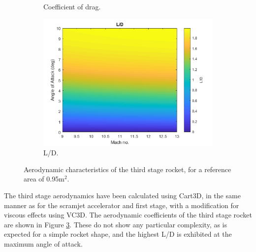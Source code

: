 \begin{figure}[!ht]
\begin{subfigure}{.5\textwidth}
					\caption{Coefficient of drag.}
					\label{fig:Cd-ThirdStage}
				\end{subfigure}
				\begin{subfigure}{.5\textwidth}
					\centering
					\includegraphics[width=0.99\linewidth]{figures/3_vehicle_design/ThirdStageLD}
					\caption{L/D.}
					\label{fig:LD-ThirdStage}
				\end{subfigure}
				\caption{Aerodynamic characteristics of the third stage rocket, for a reference area of 0.95m$^2$.} %
				\label{fig:ThirdStageAero}
			\end{figure}
			\noindent
			The third stage aerodynamics have been calculated using Cart3D, in the same manner as for the  scramjet accelerator and first stage, with a modification for viscous effects using VC3D.
		The aerodynamic coefficients of the third stage rocket are shown in Figure \ref{fig:ThirdStageAero}. These do not show any particular complexity, as is expected for a simple rocket shape, and the highest L/D is exhibited at the maximum angle of attack. 
		
	
		
		
		
